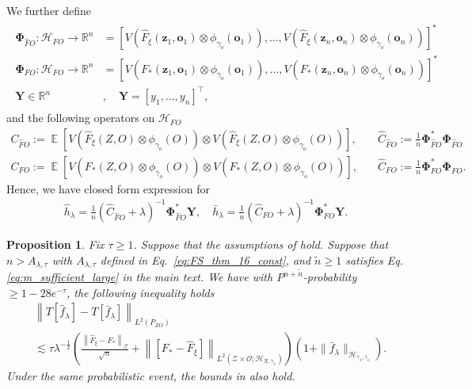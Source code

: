 \documentclass[11pt]{article}
\newcommand{\stageonesamples}{\tilde{n}}
\newcommand{\bY}{\mathbf Y}
\newcommand{\bz}{\mathbf z}
\newcommand{\bo}{\mathbf o}
\newcommand{\calZ}{\mathcal{Z}}
\newcommand{\calH}{\mathcal{H}}
\newcommand{\calG}{\mathcal{G}}
\newcommand{\calO}{\mathcal{O}}
\newcommand{\R}{\mathbb{R}}
\newcommand{\0}{\mathbf{0}}
\DeclareMathOperator{\E}{\mathbb{E}}
\newtheorem{prop}{Proposition}[section]
\newcommand{\bPhi}{\boldsymbol{\Phi}}
\begin{document}
\begin{appendix}
We further define
\begin{align}\label{eq:bPhi_FO}
\begin{aligned}
    \bPhi_{\hat{F}O} : \calH_{FO} \to \R^{n} &= \left[V \left( \hat{F}_\xi(\bz_1, \bo_1) \otimes \phi_{\gamma_o}(\bo_1) \right),\dots, V \left( \hat{F}_\xi (\bz_n, \bo_n) \otimes \phi_{\gamma_o}(\bo_n) \right) \right]^{\ast}\\
    \bPhi_{FO} : \calH_{FO} \to \R^{n} &= \left[V \left( F_{\ast}(\bz_1, \bo_1) \otimes \phi_{\gamma_o}(\bo_1) \right) ,\dots, V \left( F_{\ast}(\bz_n, \bo_n) \otimes \phi_{\gamma_o}(\bo_n) \right)  \right]^{\ast} \\
    \bY \in \R^n &, \quad \bY = [y_1, \ldots, y_n]^\top,
\end{aligned}
\end{align}
and the following operators on $\calH_{FO}$
\begin{align*}
    C_{\hat{F} O} := \E \left[  V\left( \hat{F}_\xi(Z, O) \otimes \phi_{\gamma_o}(O) \right)  \otimes  V\left( \hat{F}_\xi(Z, O) \otimes \phi_{\gamma_o}(O) \right)  \right] , &\quad \hat{C}_{\hat{F}O} := \frac{1}{n} \bPhi_{\hat{F} O}^\ast \bPhi_{\hat{F} O} \\
    C_{F O} := \E \left[  V\left( F_\ast(Z, O) \otimes \phi_{\gamma_o}(O) \right)  \otimes  V\left( F_\ast(Z, O) \otimes \phi_{\gamma_o}(O) \right)  \right] , &\quad \hat{C}_{FO} := \frac{1}{n} \bPhi_{F O}^{\ast} \bPhi_{F O}.
\end{align*}
Hence, we have closed form expression for 
\begin{align}\label{eq:closed_form_h_lambdas}
    \hat{h}_{\lambda} = \frac{1}{n}\left( \hat{C}_{\hat{F} O} + \lambda \right)^{-1}\bPhi_{\hat{F} O}^\ast \bY, \quad \bar{h}_{\lambda} = \frac{1}{n}\left( \hat{C}_{F O} + \lambda \right)^{-1}\bPhi_{FO}^\ast \bY .
\end{align}


\begin{prop}\label{prop:T_hat_f_bar_f}
Fix $\tau\geq 1$. Suppose that the assumptions of  hold. Suppose that $n > A_{\lambda,\tau}$ with $A_{\lambda,\tau}$ defined in Eq.~\eqref{eq:FS_thm_16_const}, and $\stageonesamples \geq 1$ satisfies Eq. \eqref{eq:m_sufficient_large} in the main text. We have with $P^{n+\stageonesamples}$-probability $\geq 1 - 28e^{-\tau}$, the following inequality holds
\begin{align*}
    &\left\|T [\hat{f}_{\lambda}] - T [\bar{f}_{\lambda}] \right\|_{L^2(P_{ZO})}\\ &\lesssim \tau \lambda^{-\frac{1}{2}} \left(\frac{\left\|\hat{F}_{\xi}-F_*\right\|_{\calG}}{\sqrt{n}}+\left\|\left[F_*-\hat{F}_{\xi}\right]\right\|_{L^2\left(\calZ\times\calO; \mathcal{H}_{X,\gamma_x}\right)}\right) \left(1 + \|\bar{f}_{\lambda}\|_{\calH_{\gamma_x,\gamma_o}}\right).
\end{align*}
Under the same probabilistic event, the bounds in  also hold. 
\end{prop}



\end{appendix}
\end{document}
